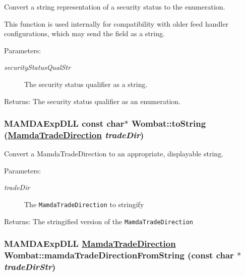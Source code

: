 Convert a string representation of a security status to the enumeration. 

This function is used internally for compatibility with older feed handler configurations, which may send the field as a string.

\begin{Desc}
\item[Parameters:]
\begin{description}
\item[{\em security\-Status\-Qual\-Str}]The security status qualifier as a string.\end{description}
\end{Desc}
\begin{Desc}
\item[Returns:]The security status qualifier as an enumeration. \end{Desc}
\hypertarget{namespaceWombat_dea7c5c2ec47f5a63fbcacf27600e898}{
\subsubsection[toString]{\setlength{\rightskip}{0pt plus 5cm}MAMDAExp\-DLL const char$\ast$ Wombat::to\-String (\hyperlink{namespaceWombat_d2479765bb418204c8ccfd3785d2bdbe}{Mamda\-Trade\-Direction} {\em trade\-Dir})}}
\label{namespaceWombat_dea7c5c2ec47f5a63fbcacf27600e898}


Convert a Mamda\-Trade\-Direction to an appropriate, displayable string. 

\begin{Desc}
\item[Parameters:]
\begin{description}
\item[{\em trade\-Dir}]The {\tt Mamda\-Trade\-Direction} to stringify\end{description}
\end{Desc}
\begin{Desc}
\item[Returns:]The stringified version of the {\tt Mamda\-Trade\-Direction} \end{Desc}
\hypertarget{namespaceWombat_b52f29f94fe338b790a8adb9ef1bca3d}{
\subsubsection[mamdaTradeDirectionFromString]{\setlength{\rightskip}{0pt plus 5cm}MAMDAExp\-DLL \hyperlink{namespaceWombat_d2479765bb418204c8ccfd3785d2bdbe}{Mamda\-Trade\-Direction} Wombat::mamda\-Trade\-Direction\-From\-String (const char $\ast$ {\em trade\-Dir\-Str})}}
\label{namespaceWombat_b52f29f94fe338b790a8adb9ef1bca3d}


